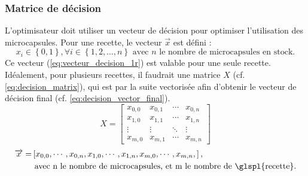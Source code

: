 \subsubsection{Matrice de décision}
L'optimisateur doit utiliser un vecteur de décision pour optimiser l'utilisation des \glspl{microcapsule}. Pour une recette, le vecteur $\overrightarrow{x}$ est défini :
\begin{equation}
    x_{i}\in \left\{0, 1\right\}, \forall i\in\left\{1, 2, \dots, n\right\} \text{ avec } n\text{ le nombre de microcapsules en stock.}
    \label{eq:vecteur_decision_1r}
\end{equation}
Ce vecteur (\autoref{eq:vecteur_decision_1r}) est valable pour une seule recette. Idéalement, pour plusieurs \glspl{recette}, il faudrait une matrice $X$ (cf. \autoref{eq:decision_matrix}), qui est par la suite \og vectorisée \fg  afin d'obtenir le vecteur de décision final (cf. \autoref{eq:decision_vector_final}). 
\begin{equation}
    X = \left[
        \begin{array}{cccc}
            x_{0, 0} & x_{0, 1} & \cdots & x_{0, n} \\
            x_{1, 0} & x_{1, 1} & \cdots & x_{1, n} \\
            \vdots   & \vdots   & \ddots & \vdots \\
            x_{m, 0} & x_{m, 1} & \cdots & x_{m, n}
        \end{array}
        \right]
    \label{eq:decision_matrix}
\end{equation}
\begin{equation}
    \begin{split}
        \overrightarrow{x} = &\left[x_{0, 0}, \cdots, x_{0, n}, x_{1, 0}, \cdots, x_{1, n}, x_{m, 0}, \cdots, x_{m, n}, \right],\\
        &\text{ avec n le nombre de microcapsules, et m le nombre de \glspl{recette}.}
    \end{split}
    \label{eq:decision_vector_final}
\end{equation}
